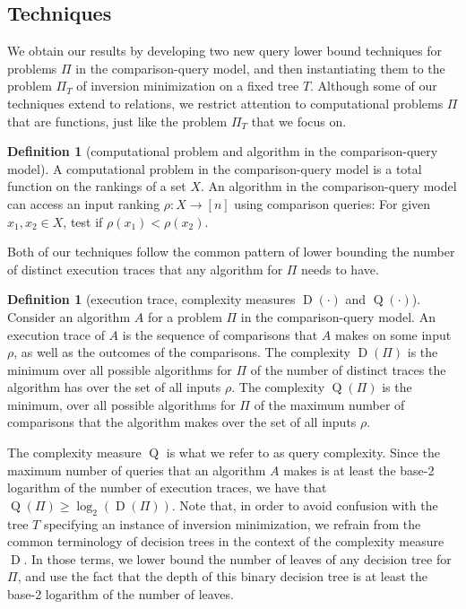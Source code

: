 \documentclass[11pt]{article}
\numberwithin{equation}{section}
\theoremstyle{definition}
\newtheorem{definition}[theorem]{Definition}
\theoremstyle{plain}
\newcommand{\ranking}{\rho}
\DeclareMathOperator{\traces}{D}
\DeclareMathOperator{\DQ}{Q}
\begin{document}
\subsection{Techniques} 
%
We obtain our results by developing two new query lower bound techniques for
%
problems $\Pi$ in the comparison-query model, and then instantiating them to the problem $\Pi_T$ of inversion minimization on a fixed tree $T$. Although some of our techniques extend to relations, we restrict attention to computational problems $\Pi$ that are functions, %
%
just like the problem $\Pi_T$ that we focus on.
\begin{definition}[computational problem and algorithm in the comparison-query model]
\label{def:computational-problem}
A computational problem in the comparison-query model is a total function on the rankings of a set $X$. An algorithm in the comparison-query model can access an input ranking $\ranking: X \to [n]$ using comparison queries: For given $x_1,x_2 \in X$, test if $\ranking(x_1)< \ranking(x_2)$.
\end{definition}

Both of our techniques follow the common pattern of lower bounding the number of distinct execution traces that any algorithm for $\Pi$ needs to have.
\begin{definition}[execution trace, complexity measures $\traces(\cdot)$ and $\DQ(\cdot)$]
\label{def:execution-and-deterministic}
Consider an algorithm $A$ for a problem $\Pi$ in the comparison-query model. An execution trace of $A$ is the sequence of comparisons that $A$ makes on some input $\ranking$, as well as the outcomes of the comparisons. The complexity $\traces(\Pi)$ is the minimum over all possible algorithms for $\Pi$ of the number of distinct traces the algorithm has over the set of all inputs $\ranking$. The complexity $\DQ(\Pi)$ is the minimum, over all possible algorithms for $\Pi$ of the maximum number of comparisons that the algorithm makes over the set of all inputs $\ranking$.
\end{definition}
The complexity measure $\DQ$ is what we refer to as query complexity. Since the maximum number of queries that an algorithm $A$ makes is at least the base-2 logarithm of the number of execution traces, we have that $\DQ(\Pi) \ge \log_2(\traces(\Pi))$. 
Note that, in order to avoid confusion with the tree $T$ specifying an instance of inversion minimization, we refrain from the common terminology of decision trees in the context of the complexity measure $\traces$. In those terms, we lower bound the number of leaves of any decision tree for $\Pi$, and use the fact that the depth of this binary decision tree is at least the base-2 logarithm of the number of leaves.
\end{document}
